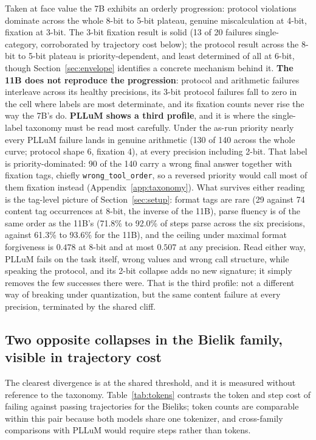 \documentclass[11pt]{article}
\begin{document}
Taken at face value the 7B exhibits an orderly progression: protocol violations dominate across the whole 8-bit to 5-bit plateau, genuine miscalculation at 4-bit, fixation at 3-bit. The 3-bit fixation result is solid (13 of 20 failures single-category, corroborated by trajectory cost below); the protocol result across the 8-bit to 5-bit plateau is priority-dependent, and least determined of all at 6-bit, though Section~\ref{sec:envelope} identifies a concrete mechanism behind it. \textbf{The 11B does not reproduce the progression}: protocol and arithmetic failures interleave across its healthy precisions, its 3-bit protocol failures fall to zero in the cell where labels are most determinate, and its fixation counts never rise the way the 7B's do. \textbf{PLLuM shows a third profile}, and it is where the single-label taxonomy must be read most carefully. Under the as-run priority nearly every PLLuM failure lands in genuine arithmetic (130 of 140 across the whole curve; protocol shape 6, fixation 4), at every precision including 2-bit. That label is priority-dominated: 90 of the 140 carry a wrong final answer together with fixation tags, chiefly \texttt{wrong\_tool\_order}, so a reversed priority would call most of them fixation instead (Appendix~\ref{app:taxonomy}). What survives either reading is the tag-level picture of Section~\ref{sec:setup}: format tags are rare (29 against 74 content tag occurrences at 8-bit, the inverse of the 11B), parse fluency is of the same order as the 11B's (71.8\% to 92.0\% of steps parse across the six precisions, against 61.3\% to 93.6\% for the 11B), and the ceiling under maximal format forgiveness is $0.478$ at 8-bit and at most $0.507$ at any precision. Read either way, PLLuM fails on the task itself, wrong values and wrong call structure, while speaking the protocol, and its 2-bit collapse adds no new signature; it simply removes the few successes there were. That is the third profile: not a different way of breaking under quantization, but the same content failure at every precision, terminated by the shared cliff.

\subsection{Two opposite collapses in the Bielik family, visible in trajectory cost}
The clearest divergence is at the shared threshold, and it is measured without reference to the taxonomy. Table~\ref{tab:tokens} contrasts the token and step cost of failing against passing trajectories for the Bieliks; token counts are comparable within this pair because both models share one tokenizer, and cross-family comparisons with PLLuM would require steps rather than tokens.
\end{document}
